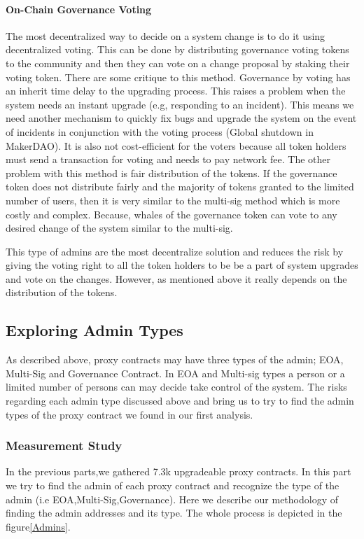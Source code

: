 \paragraph{On-Chain Governance Voting}
The most decentralized way to decide on a system change is to do it using decentralized voting. This can be done by distributing governance voting tokens to the community and then they can vote on a change proposal by staking their voting token. 
There are some critique to this method. Governance by voting has an inherit time delay to the upgrading process. This raises a problem when the system needs an instant upgrade (e.g, responding to an incident). This means we need another mechanism to quickly fix bugs and upgrade the system on the event of incidents in conjunction with the voting process (\eg Global shutdown in MakerDAO).
It is also not cost-efficient for the voters because all token holders must send a transaction for voting and needs to pay network fee.
The other problem with this method is fair distribution of the tokens. If the governance token does not distribute fairly and the majority of tokens granted to the limited number of users, then it is very similar to the multi-sig method which is more costly and complex. Because, whales of the governance token can vote to any desired change of the system similar to the multi-sig.
 
This type of admins are the most decentralize solution and reduces the risk by giving the voting right to all the token holders to be be a part of system upgrades and vote on the changes. However, as mentioned above it really depends on the distribution of the tokens.




\subsection{Exploring Admin Types}

As described above, proxy contracts may have three types of the admin; EOA, Multi-Sig and Governance Contract. In EOA and Multi-sig types a person or a limited number of persons can may decide take control of the system. The risks regarding each admin type discussed above and bring us to try to find the admin types of the proxy contract we found in our first analysis.

\subsubsection{Measurement Study}
In the previous parts,we gathered 7.3k upgradeable proxy contracts. In this part we try to find the admin of each proxy contract and recognize the type of the admin (i.e EOA,Multi-Sig,Governance).
Here we describe our methodology of finding the admin addresses and its type. The whole process is depicted in the figure\ref{Admins}.

